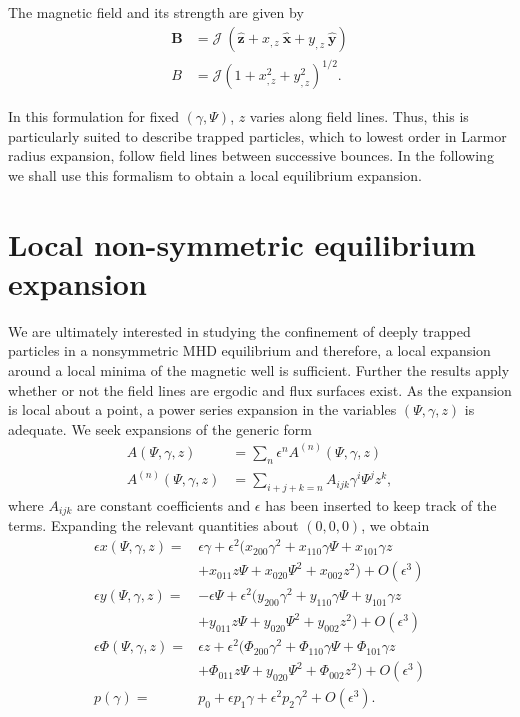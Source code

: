 \documentclass[aip,pop,reprint]{revtex4-1}
\newcommand*{\ep}{\epsilon}
\newcommand*{\B}{\bm{B}}
\newcommand*{\Jac}{\mathscr{J}}
\newcommand*{\xh}{\bm{\hat{x}}}
\newcommand*{\yh}{\bm{\hat{y}}}
\newcommand*{\zh}{\bm{\hat{z}}}
\newcommand*{\xcz}{x_{,z}}
\newcommand*{\ycz}{y_{,z}}
\begin{document}
The magnetic field and its strength are given by
\begin{subequations}
\begin{align}
\B &= \Jac\:(\zh + \xcz\: \xh + \ycz\:\yh)\label{BII}\\
B&= \Jac(1+\xcz^2+\ycz^2)^{1/2}. \label{BsqII}
\end{align}
\end{subequations}

In this formulation for fixed $(\gamma,\Psi)$, $z$ varies along field lines. Thus, this is particularly suited to describe trapped particles, which to lowest order in Larmor radius expansion, follow field lines between successive bounces. In the following we shall use this formalism to obtain a local equilibrium expansion. 

\section{Local non-symmetric equilibrium expansion}
\label{sec:localexp}
We are ultimately interested in studying the confinement of deeply trapped particles in a nonsymmetric MHD equilibrium and therefore, a local expansion around a local minima of the magnetic well is sufficient. Further the results apply whether or not the field lines are ergodic and flux surfaces exist. As the expansion is local about a point, a power series expansion in the variables $(\Psi,\gamma,z)$ is adequate.
 We seek expansions of the generic form \begin{align*}
     A(\Psi,\gamma,z)&=\sum_n \ep^n A^{(n)}(\Psi,\gamma,z)\\
     A^{(n)}(\Psi,\gamma,z)&=\sum_{i+j+k=n} A_{ijk}\gamma^i \Psi^j z^k,
\end{align*} 
 where $A_{ijk}$ are constant coefficients and $\epsilon$ has been inserted to keep track of the terms. Expanding the relevant quantities about $(0,0,0)$, we obtain
\begin{subequations}
\begin{align}
\ep x(\Psi,\gamma,z)=& \ep \gamma +\epsilon^2(x_{200} \gamma^2 + x_{110} \gamma \Psi+ x_{101} \gamma z \nonumber\\
&+ x_{011} z \Psi+ x_{020} \Psi^2 +x_{002} z^2)+ O(\epsilon^3) \label{xser}\\
\ep y(\Psi,\gamma,z)=& -\ep \Psi + \epsilon^2 (y_{200} \gamma^2 + y_{110} \gamma \Psi+ y_{101} \gamma z \nonumber\\
&+ y_{011} z \Psi+y_{020} \Psi^2 +y_{002} z^2)+ O(\epsilon^3) \label{yser}\\
\ep\Phi(\Psi,\gamma,z)=& \ep z + \epsilon^2 (\Phi_{200} \gamma^2 + \Phi_{110} \gamma \Psi+ \Phi_{101} \gamma z \nonumber\\
&+ \Phi_{011} z \Psi+y_{020} \Psi^2 +\Phi_{002} z^2)+ O(\epsilon^3)\\
p(\gamma)=&p_0 +\epsilon p_1 \gamma + \epsilon^2 p_2 \gamma^2 +O(\epsilon^3). \label{phiser}
\end{align}
\end{subequations}
 
\end{document}
